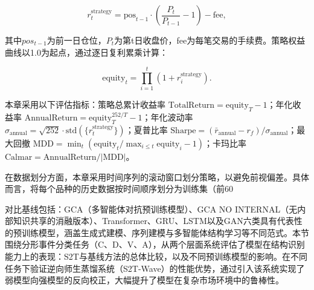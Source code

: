\begin{equation}
r_t^{\text{strategy}} = \text{pos}_{t-1} \cdot \left(\frac{P_t}{P_{t-1}} - 1\right) - \text{fee},
\end{equation}

其中$pos_{t-1}$为前一日仓位，$P_t$为第t日收盘价，fee为每笔交易的手续费。策略权益曲线以1.0为起点，通过逐日复利累乘计算：

\begin{equation}
\text{equity}_t = \prod_{i=1}^{t}\left(1 + r_i^{\text{strategy}}\right).
\end{equation}

本章采用以下评估指标：策略总累计收益率 $\text{TotalReturn} = \text{equity}_T - 1$；年化收益率 $\text{AnnualReturn} = \text{equity}_T^{252/T} - 1$；年化波动率 $\sigma_{\text{annual}} = \sqrt{252} \cdot \text{std}(\{r_t^{\text{strategy}}\})$；夏普比率 $\text{Sharpe} = (\bar{r}_{\text{annual}} - r_f) / \sigma_{\text{annual}}$；最大回撤 $\text{MDD} = \min_t\left(\text{equity}_t / \max_{i\le t}\text{equity}_i - 1\right)$；卡玛比率 $\text{Calmar} = \text{AnnualReturn} / |\text{MDD}|$。

在数据划分方面，本章采用时间序列的滚动窗口划分策略，以避免前视偏差。具体而言，将每个品种的历史数据按时间顺序划分为训练集（前60%

对比基线包括：GCA（多智能体对抗预训练模型）、GCA NO INTERNAL（无内部知识共享的消融版本）、Transformer、GRU、LSTM以及GAN六类具有代表性的预训练模型，涵盖生成式建模、序列建模与多智能体结构学习等不同范式。本节围绕分形事件分类任务（C、D、V、A），从两个层面系统评估了模型在结构识别能力上的表现：S2T与基线方法的总体比较，以及不同预训练模型的影响。在不同任务下验证逆向师生蒸馏系统（S2T-Wave）的性能优势，通过引入该系统实现了弱模型向强模型的反向校正，大幅提升了模型在复杂市场环境中的鲁棒性。

